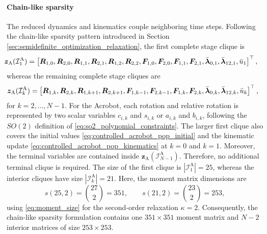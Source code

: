 \paragraph{Chain-like sparsity}
The reduced dynamics and kinematics couple neighboring time steps.
Following the chain-like sparsity pattern introduced in Section 
\ref{sec:semidefinite_optimization_relaxation}, the first
complete stage clique is
\begin{equation}
\hspace{-1.3em}
\begin{aligned}
\bm{z}_{\mathrm{A}}(\mathcal I_1^{\mathrm{A}})
=
\left[
\bm{R}_{1,0},\bm{R}_{2,0},
\bm{R}_{1,1},\bm{R}_{2,1},
\bm{R}_{1,2},\bm{R}_{2,2},
\bm{F}_{1,0},\bm{F}_{2,0},
\bm{F}_{1,1},\bm{F}_{2,1},
\bar{\bm{\lambda}}_{0,1},
\bar{\bm{\lambda}}_{12,1},
\bar u_1
\right]^{\top},
\end{aligned}
\label{eq:acrobot_full_self_initial_clique}
\end{equation}
whereas the remaining complete stage cliques are
\begin{equation}
\hspace{-0.8em}
\begin{aligned}
\bm{z}_{\mathrm{A}}(\mathcal I_k^{\mathrm{A}})
=
\left[
\bm{R}_{1,k},\bm{R}_{2,k},
\bm{R}_{1,k+1},\bm{R}_{2,k+1},
\bm{F}_{1,k-1},\bm{F}_{2,k-1},
\bm{F}_{1,k},\bm{F}_{2,k},
\bar{\bm{\lambda}}_{0,k},
\bar{\bm{\lambda}}_{12,k},
\bar u_k
\right]^{\top},
\end{aligned}
\label{eq:acrobot_full_self_interior_cliques}
\end{equation}
for $k=2,\ldots,N-1$. For the Acrobot, each rotation and relative rotation
is represented by two scalar variables $c_{i,k}$ and $s_{i,k}$ or $a_{i,k}$ and $b_{i,k}$, 
following the $SO(2)$ definition of \eqref{eq:so2_polynomial_constraints}.
The larger first clique also covers the initial values \eqref{eq:controlled_acrobot_pop_initial}
and the kinematic update \eqref{eq:controlled_acrobot_pop_kinematics} 
at $k=0$ and $k=1$. 
Moreover, the terminal variables are contained inside
\(\bm{z}_{\mathrm{A}}(\mathcal I_{N-1}^{\mathrm{A}})\).
Therefore, no additional terminal clique is required. The size of the first clique is
\(|\mathcal I_1^{\mathrm{A}}|=25\), whereas the interior cliques have size
\(|\mathcal I_k^{\mathrm{A}}|=21\).
Here, the moment matrix dimensions are 
\begin{equation}
s(25,2)=\binom{27}{2}=351,
\qquad
s(21,2)=\binom{23}{2}=253,
\label{eq:acrobot_full_self_moment_sizes}
\end{equation}
using \eqref{eq:moment_size} for the second-order relaxation $\kappa = 2$.
Consequently, the chain-like sparsity formulation contains one $351\times351$ 
moment matrix and $N-2$ interior matrices of size $253\times253$.

